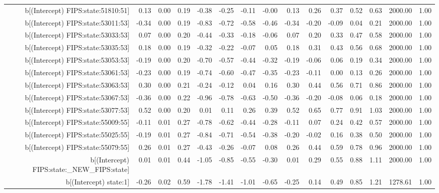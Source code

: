 \begin{table}[ht]
\begin{tabular}{rrrrrrrrrrrrrrr}
  b[(Intercept) FIPS:state:51810:51] & 0.13 & 0.00 & 0.19 & -0.38 & -0.25 & -0.11 & -0.00 & 0.13 & 0.26 & 0.37 & 0.52 & 0.63 & 2000.00 & 1.00 \\ 
  b[(Intercept) FIPS:state:53011:53] & -0.34 & 0.00 & 0.19 & -0.83 & -0.72 & -0.58 & -0.46 & -0.34 & -0.20 & -0.09 & 0.04 & 0.21 & 2000.00 & 1.00 \\ 
  b[(Intercept) FIPS:state:53033:53] & 0.07 & 0.00 & 0.20 & -0.44 & -0.33 & -0.18 & -0.06 & 0.07 & 0.20 & 0.33 & 0.47 & 0.58 & 2000.00 & 1.00 \\ 
  b[(Intercept) FIPS:state:53035:53] & 0.18 & 0.00 & 0.19 & -0.32 & -0.22 & -0.07 & 0.05 & 0.18 & 0.31 & 0.43 & 0.56 & 0.68 & 2000.00 & 1.00 \\ 
  b[(Intercept) FIPS:state:53053:53] & -0.19 & 0.00 & 0.20 & -0.70 & -0.57 & -0.44 & -0.32 & -0.19 & -0.06 & 0.06 & 0.19 & 0.34 & 2000.00 & 1.00 \\ 
  b[(Intercept) FIPS:state:53061:53] & -0.23 & 0.00 & 0.19 & -0.74 & -0.60 & -0.47 & -0.35 & -0.23 & -0.11 & 0.00 & 0.13 & 0.26 & 2000.00 & 1.00 \\ 
  b[(Intercept) FIPS:state:53063:53] & 0.30 & 0.00 & 0.21 & -0.24 & -0.12 & 0.04 & 0.16 & 0.30 & 0.44 & 0.56 & 0.71 & 0.86 & 2000.00 & 1.00 \\ 
  b[(Intercept) FIPS:state:53067:53] & -0.36 & 0.00 & 0.22 & -0.96 & -0.78 & -0.63 & -0.50 & -0.36 & -0.20 & -0.08 & 0.06 & 0.18 & 2000.00 & 1.00 \\ 
  b[(Intercept) FIPS:state:53077:53] & 0.52 & 0.00 & 0.20 & 0.01 & 0.11 & 0.26 & 0.39 & 0.52 & 0.65 & 0.77 & 0.91 & 1.03 & 2000.00 & 1.00 \\ 
  b[(Intercept) FIPS:state:55009:55] & -0.11 & 0.01 & 0.27 & -0.78 & -0.62 & -0.44 & -0.28 & -0.11 & 0.07 & 0.24 & 0.42 & 0.57 & 2000.00 & 1.00 \\ 
  b[(Intercept) FIPS:state:55025:55] & -0.19 & 0.01 & 0.27 & -0.84 & -0.71 & -0.54 & -0.38 & -0.20 & -0.02 & 0.16 & 0.38 & 0.50 & 2000.00 & 1.00 \\ 
  b[(Intercept) FIPS:state:55079:55] & 0.26 & 0.01 & 0.27 & -0.43 & -0.26 & -0.07 & 0.08 & 0.26 & 0.44 & 0.59 & 0.78 & 0.96 & 2000.00 & 1.00 \\ 
  b[(Intercept) FIPS:state:\_NEW\_FIPS:state] & 0.01 & 0.01 & 0.44 & -1.05 & -0.85 & -0.55 & -0.30 & 0.01 & 0.29 & 0.55 & 0.88 & 1.11 & 2000.00 & 1.00 \\ 
  b[(Intercept) state:1] & -0.26 & 0.02 & 0.59 & -1.78 & -1.41 & -1.01 & -0.65 & -0.25 & 0.14 & 0.49 & 0.85 & 1.21 & 1278.61 & 1.00 \\ 

\end{tabular}
\end{table}
